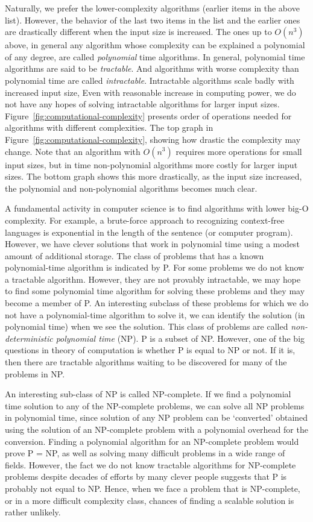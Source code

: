 Naturally, we prefer the lower-complexity algorithms
(earlier items in the above list).
However, the behavior of the last two items in the list
and the earlier ones are drastically different when the input size is increased.
The ones up to $O(n^{3})$ above,
in general any algorithm whose complexity can be explained
a polynomial of any degree,
are called \emph{polynomial} time algorithms.
In general, polynomial time algorithms are said to be \emph{tractable}.
And algorithms with worse complexity than polynomial time
are called \emph{intractable}.
Intractable algorithms scale badly with increased input size,
Even with reasonable increase in computing power,
we do not have any hopes of solving intractable algorithms
for larger input sizes.
Figure~\ref{fig:computational-complexity}
presents order of operations needed for algorithms
with different complexities.
The top graph in Figure~\ref{fig:computational-complexity},
showing how drastic the complexity may change.
Note that an algorithm with $O(n^{3})$ requires more operations
for small input sizes,
but in time non-polynomial algorithms more costly for larger input sizes.
The bottom graph shows this more drastically,
as the input size increased,
the polynomial and non-polynomial algorithms becomes much clear.

A fundamental activity in computer science is to find
algorithms with lower big-O complexity.
For example,
a brute-force approach to recognizing context-free languages 
is exponential in the length of the sentence (or computer program).
However, we have clever solutions that work in polynomial time
using a modest amount of additional storage.
The class of problems that has a known polynomial-time algorithm is
indicated by P.
For some problems we do not know a tractable algorithm.
However, they are not provably intractable,
we may hope to find some polynomial time algorithm for solving
these problems and they may become a member of P.
An interesting subclass of these problems
for which we do not have a polynomial-time algorithm to solve it,
we can identify the solution (in polynomial time) when we see the solution.
This class of problems are called
\emph{non-deterministic polynomial time} (NP).
P is a subset of NP.
However, one of the big questions in theory of computation is
whether P is equal to NP or not.
If it is,
then there are tractable algorithms waiting to be discovered
for many of the problems in NP.

An interesting sub-class of NP is called NP-complete.
If we find a polynomial time solution to any of the NP-complete problems,
we can solve all NP problems in polynomial time,
since solution of any NP problem can be `converted' obtained using
the solution of an NP-complete problem
with a polynomial overhead for the conversion.
Finding a polynomial algorithm for an NP-complete problem
would prove P = NP,
as well as solving many difficult problems in a wide range of fields.
However, 
the fact we do not know tractable algorithms for NP-complete problems
despite decades of efforts by many clever people
suggests that P is probably not equal to NP.
Hence, when we face a problem that is NP-complete,
or in a more difficult complexity class,
chances of finding a scalable solution is rather unlikely.

